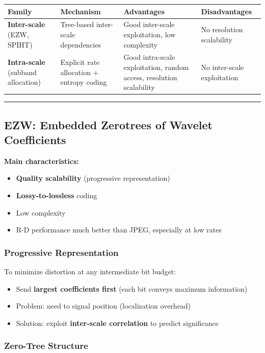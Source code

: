 \begin{center}
\begin{tabular}{|l|l|l|l|}
\hline
\textbf{Family} & \textbf{Mechanism} & \textbf{Advantages} & \textbf{Disadvantages} \\ \hline
\textbf{Inter-scale} (EZW, SPIHT) & Tree-based inter-scale dependencies & Good inter-scale exploitation, low complexity & No resolution scalability \\ \hline
\textbf{Intra-scale} (subband allocation) & Explicit rate allocation + entropy coding & Good intra-scale exploitation, random access, resolution scalability & No inter-scale exploitation \\ \hline
\end{tabular}
\end{center}

\bigskip\hrule\bigskip

\subsection{EZW: Embedded Zerotrees of Wavelet Coefficients}

\textbf{Main characteristics:}
\begin{itemize}
\item \textbf{Quality scalability} (progressive representation)
\item \textbf{Lossy-to-lossless} coding
\item Low complexity
\item R-D performance much better than JPEG, especially at low rates
\end{itemize}

\subsubsection{Progressive Representation}

To minimize distortion at any intermediate bit budget:
\begin{itemize}
\item Send \textbf{largest coefficients first} (each bit conveys maximum information)
\item Problem: need to signal position (localization overhead)
\item Solution: exploit \textbf{inter-scale correlation} to predict significance
\end{itemize}

\subsubsection{Zero-Tree Structure}

